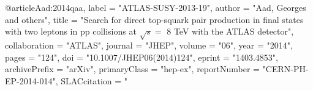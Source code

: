 @article{Aad:2014qaa,
      label          = "ATLAS-SUSY-2013-19",
      author         = "Aad, Georges and others",
      title          = "{Search for direct top-squark pair production in final
                        states with two leptons in pp collisions at $\sqrt{s} =$
                        8 TeV with the ATLAS detector}",
      collaboration  = "ATLAS",
      journal        = "JHEP",
      volume         = "06",
      year           = "2014",
      pages          = "124",
      doi            = "10.1007/JHEP06(2014)124",
      eprint         = "1403.4853",
      archivePrefix  = "arXiv",
      primaryClass   = "hep-ex",
      reportNumber   = "CERN-PH-EP-2014-014",
      SLACcitation   = "%
}

